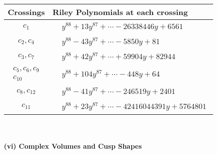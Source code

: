\documentclass[1p]{elsarticle_modified}
\theoremstyle{definition}
\begin{document}
\begin{tabular}{m{50pt}|m{274pt}}
Crossings & \hspace{64pt}Riley Polynomials at each crossing \\
\hline $$\begin{aligned}c_{1}\end{aligned}$$&$\begin{aligned}
&y^{88}+13 y^{87}+\cdots-26338446 y+6561
\end{aligned}$\\
\hline $$\begin{aligned}c_{2},c_{4}\end{aligned}$$&$\begin{aligned}
&y^{88}-43 y^{87}+\cdots-5850 y+81
\end{aligned}$\\
\hline $$\begin{aligned}c_{3},c_{7}\end{aligned}$$&$\begin{aligned}
&y^{88}+42 y^{87}+\cdots+59904 y+82944
\end{aligned}$\\
\hline $$\begin{aligned}c_{5},c_{6},c_{9}\\c_{10}\end{aligned}$$&$\begin{aligned}
&y^{88}+104 y^{87}+\cdots-448 y+64
\end{aligned}$\\
\hline $$\begin{aligned}c_{8},c_{12}\end{aligned}$$&$\begin{aligned}
&y^{88}-41 y^{87}+\cdots-246519 y+2401
\end{aligned}$\\
\hline $$\begin{aligned}c_{11}\end{aligned}$$&$\begin{aligned}
&y^{88}+23 y^{87}+\cdots-42416044391 y+5764801
\end{aligned}$\\
\hline
\end{tabular}\\~\\
\newpage\flushleft \textbf{(vi) Complex Volumes and Cusp Shapes}
\end{document}
